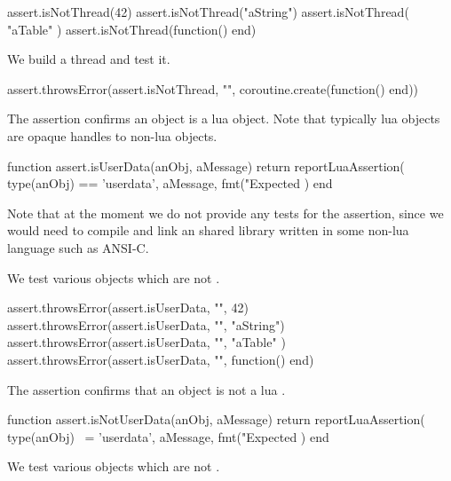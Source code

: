 \startLuaTest
  assert.isNotThread(42)
  assert.isNotThread("aString")
  assert.isNotThread({ "aTable" })
  assert.isNotThread(function() end)
\stopLuaTest
\stopTestCase


We build a thread and test it.

\startLuaTest
  assert.throwsError(assert.isNotThread, "",
    coroutine.create(function() end))
\stopLuaTest
\stopTestCase

\stopTestSuite


The  assertion confirms an object is a lua 
 object. Note that typically lua  objects 
are opaque handles to non-lua objects. 

\startLuaCode
function assert.isUserData(anObj, aMessage)
  return reportLuaAssertion(
    type(anObj) == 'userdata',
    aMessage,
    fmt("Expected %
  )
end
\stopLuaCode

Note that at the moment we do not provide any  tests for 
the  assertion, since we would need to compile and 
link an shared library written in some non-lua language such as ANSI-C. 


We test various objects which are not .

\startLuaTest
  assert.throwsError(assert.isUserData, "", 42)
  assert.throwsError(assert.isUserData, "", "aString")
  assert.throwsError(assert.isUserData, "", { "aTable" })
  assert.throwsError(assert.isUserData, "", function() end)
\stopLuaTest
\stopTestCase

\stopTestSuite

\godown[2ex]
The  assertion confirms that an object is not a 
lua . 


\startLuaCode
function assert.isNotUserData(anObj, aMessage)
  return reportLuaAssertion(
    type(anObj) ~= 'userdata',
    aMessage,
    fmt("Expected %
  )
end
\stopLuaCode


We test various objects which are not .

